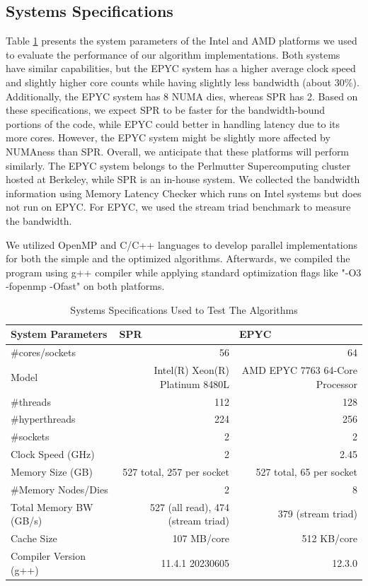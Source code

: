 \documentclass[sigconf]{acmart}
\begin{document}
\subsection{Systems Specifications}
Table \ref{tab:sysspec} presents the system parameters of the Intel and AMD platforms we used to evaluate the performance of our algorithm implementations. Both systems have similar capabilities, but the EPYC system has a higher average clock speed and slightly higher core counts while having slightly less bandwidth (about 30\%). Additionally, the EPYC system has 8 NUMA dies, whereas SPR has 2. Based on these specifications, we expect SPR to be faster for the bandwidth-bound portions of the code, while EPYC could better in handling latency due to its more cores. However, the EPYC system might be slightly more affected by NUMAness than SPR. Overall, we anticipate that these platforms will perform similarly. The EPYC system belongs to the Perlmutter Supercomputing cluster hosted at Berkeley, while SPR is an in-house system. We collected the bandwidth information using Memory Latency Checker which runs on Intel systems but does not run on EPYC. For EPYC, we used the stream triad benchmark to measure the bandwidth. 

We utilized OpenMP and C/C++ languages to develop parallel implementations for both the simple and the optimized algorithms. Afterwards, we compiled the program using g++ compiler while applying standard optimization flags like "-O3 -fopenmp -Ofast" on both platforms.

\begin{table}[tbhp]
  \centering
  \caption{Systems Specifications Used to Test The Algorithms}
    \begin{tabular}{lrr}
    \toprule
  
    \textbf{System Parameters} & \multicolumn{1}{l}{\textbf{SPR}} & \multicolumn{1}{l}{\textbf{EPYC}} \\
      \hline
    \#cores/sockets & 56    & 64 \\
      \hline
    Model & Intel(R) Xeon(R) Platinum 8480L & AMD EPYC 7763 64-Core Processor \\
    \hline
    \#threads & 112   & 128 \\
    \hline
    \#hyperthreads & 224   & 256 \\
    \hline
    \#sockets & 2     & 2 \\
    \hline
    Clock Speed (GHz) & 2     & 2.45 \\
    \hline
    Memory Size (GB) & 527 total, 257 per socket & 527 total, 65 per socket  \\
    \hline
    \#Memory Nodes/Dies & 2     & 8 \\
    \hline
    Total Memory BW (GB/s) & 527 (all read), 474 (stream triad) & 379 (stream triad) \\
    \hline
    Cache Size & 107 MB/core & 512 KB/core \\
    \hline
    Compiler Version (g++) & 11.4.1 20230605 & 12.3.0 \\
    \bottomrule
    \end{tabular}%
  \label{tab:sysspec}%
\end{table}%
\end{document}
